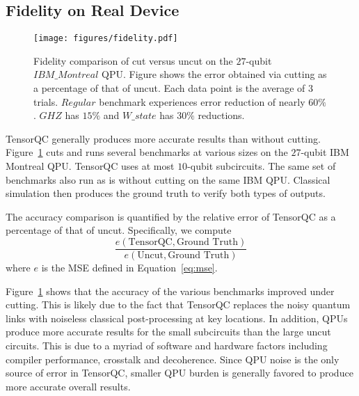 \subsection{Fidelity on Real Device}
\begin{figure}[t]
    \centering
    \texttt{[image: figures/fidelity.pdf]}
    \caption{Fidelity comparison of cut versus uncut on the $27$-qubit $IBM\_Montreal$ QPU.
    Figure shows the error obtained via cutting as a percentage of that of uncut.
    Each data point is the average of $3$ trials.
    $Regular$ benchmark experiences error reduction of nearly $60\%$.
    $GHZ$ has $15\%$ and $W\_state$ has $30\%$ reductions.}
    \label{fig:fidelity}
\end{figure}

TensorQC generally produces more accurate results than without cutting.
Figure~\ref{fig:fidelity} cuts and runs several benchmarks at various sizes on the $27$-qubit IBM Montreal QPU.
TensorQC uses at most $10$-qubit subcircuits.
The same set of benchmarks also run as is without cutting on the same IBM QPU.
Classical simulation then produces the ground truth to verify both types of outputs.

The accuracy comparison is quantified by the relative error of TensorQC as a percentage of that of uncut.
Specifically, we compute
\begin{equation*}
    \frac{e(\textrm{TensorQC},\textrm{Ground Truth})}{e(\textrm{Uncut},\textrm{Ground Truth})}
\end{equation*}
where $e$ is the MSE defined in Equation~\ref{eq:mse}.

Figure~\ref{fig:fidelity} shows that the accuracy of the various benchmarks improved under cutting.
This is likely due to the fact that TensorQC replaces the noisy quantum links with noiseless classical post-processing at key locations.
In addition, QPUs produce more accurate results for the small subcircuits than the large uncut circuits.
This is due to a myriad of software and hardware factors including compiler performance, crosstalk and decoherence.
Since QPU noise is the only source of error in TensorQC,
smaller QPU burden is generally favored to produce more accurate overall results.